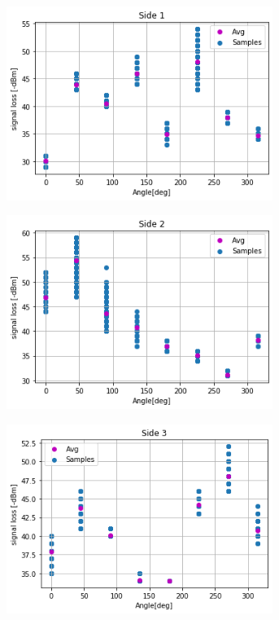 \begin{figure}
    \centering
    \begin{subfigure}{0.50\textwidth}
        \centering
        \includegraphics[width=0.95\textwidth]{figs/img/Side1_Data.png}
        \label{fig:Side1Dat}
    \end{subfigure}%
    \begin{subfigure}{0.50\textwidth}
        \centering
        \includegraphics[width=0.95\textwidth]{figs/img/Side2_Data.png}
        \label{fig:Side2Dat}
    \end{subfigure}
        \begin{subfigure}{0.50\textwidth}
        \centering
        \includegraphics[width=0.95\textwidth]{figs/img/Side3_Data.png}

\end{subfigure}
\end{figure}

